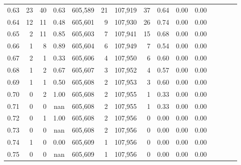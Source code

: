 \begin{tabular}{rrrcrrrrrrrrrrr}
0.63 &      23 &     40 &                                       0.63 &  605,589 &       21 &  107,919 &       37 &  0.64 &  0.00 &                         0.00 \\
0.64 &      12 &     11 &                                       0.48 &  605,601 &        9 &  107,930 &       26 &  0.74 &  0.00 &                         0.00 \\
0.65 &       2 &     11 &                                       0.85 &  605,603 &        7 &  107,941 &       15 &  0.68 &  0.00 &                         0.00 \\
0.66 &       1 &      8 &                                       0.89 &  605,604 &        6 &  107,949 &        7 &  0.54 &  0.00 &                         0.00 \\
0.67 &       2 &      1 &                                       0.33 &  605,606 &        4 &  107,950 &        6 &  0.60 &  0.00 &                         0.00 \\
0.68 &       1 &      2 &                                       0.67 &  605,607 &        3 &  107,952 &        4 &  0.57 &  0.00 &                         0.00 \\
0.69 &       1 &      1 &                                       0.50 &  605,608 &        2 &  107,953 &        3 &  0.60 &  0.00 &                         0.00 \\
0.70 &       0 &      2 &                                       1.00 &  605,608 &        2 &  107,955 &        1 &  0.33 &  0.00 &                         0.00 \\
0.71 &       0 &      0 &                                        nan &  605,608 &        2 &  107,955 &        1 &  0.33 &  0.00 &                         0.00 \\
0.72 &       0 &      1 &                                       1.00 &  605,608 &        2 &  107,956 &        0 &  0.00 &  0.00 &                         0.00 \\
0.73 &       0 &      0 &                                        nan &  605,608 &        2 &  107,956 &        0 &  0.00 &  0.00 &                         0.00 \\
0.74 &       1 &      0 &                                       0.00 &  605,609 &        1 &  107,956 &        0 &  0.00 &  0.00 &                         0.00 \\
0.75 &       0 &      0 &                                        nan &  605,609 &        1 &  107,956 &        0 &  0.00 &  0.00 &                         0.00 \\

\end{tabular}
